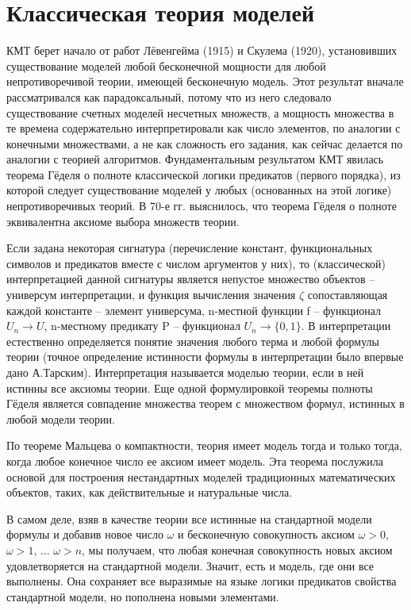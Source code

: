 \documentclass[12pt, a4paper]{article}
\begin{document}
\section{Классическая теория моделей}

КМТ берет начало от работ Лёвенгейма (1915) и Скулема (1920), установивших существование
моделей любой бесконечной мощности для любой непротиворечивой теории, имеющей бесконечную
модель. Этот результат вначале рассматривался как парадоксальный, потому что из него следовало
существование счетных моделей несчетных множеств, а мощность множества в те времена
содержательно интерпретировали как число элементов, по аналогии с конечными множествами, а не
как сложность его задания, как сейчас делается по аналогии с теорией алгоритмов. Фундаментальным
результатом КМТ явилась теорема Гёделя о полноте классической логики предикатов (первого
порядка), из которой следует существование моделей у любых (основанных на этой логике)
непротиворечивых теорий. В 70-е гг. выяснилось, что теорема Гёделя о полноте эквивалентна аксиоме
выбора множеств теории.

Если задана некоторая сигнатура (перечисление констант, функциональных символов и предикатов
вместе с числом аргументов у них), то (классической) интерпретацией данной сигнатуры является
непустое множество объектов – универсум интерпретации, и функция вычисления значения $\zeta$
сопоставляющая каждой константе – элемент универсума, n-местной функции f – функционал $U_n \rightarrow U$,
n-местному предикату P – функционал $U_n \rightarrow \{0,1\}$. В интерпретации естественно
определяется
понятие значения любого терма и любой формулы теории (точное определение истинности формулы в
интерпретации было впервые дано А.Тарским). Интерпретация называется моделью теории, если в ней
истинны все аксиомы теории. Еще одной формулировкой теоремы полноты Гёделя является
совпадение множества теорем с множеством формул, истинных в любой модели теории.

По теореме Мальцева о компактности, теория имеет модель тогда и только тогда, когда любое
конечное число ее аксиом имеет модель. Эта теорема послужила основой для построения
нестандартных моделей традиционных математических объектов, таких, как действительные и
натуральные числа.

В самом деле, взяв в качестве теории все истинные на стандартной модели формулы и добавив новое
число $\omega$ и бесконечную совокупность аксиом $\omega > 0$, $\omega > 1$, ... $\omega > n$, мы получаем, что любая конечная
совокупность новых аксиом удовлетворяется на стандартной модели. Значит, есть и модель, где они
все выполнены. Она сохраняет все выразимые на языке логики предикатов свойства стандартной
модели, но пополнена новыми элементами.
\end{document}
